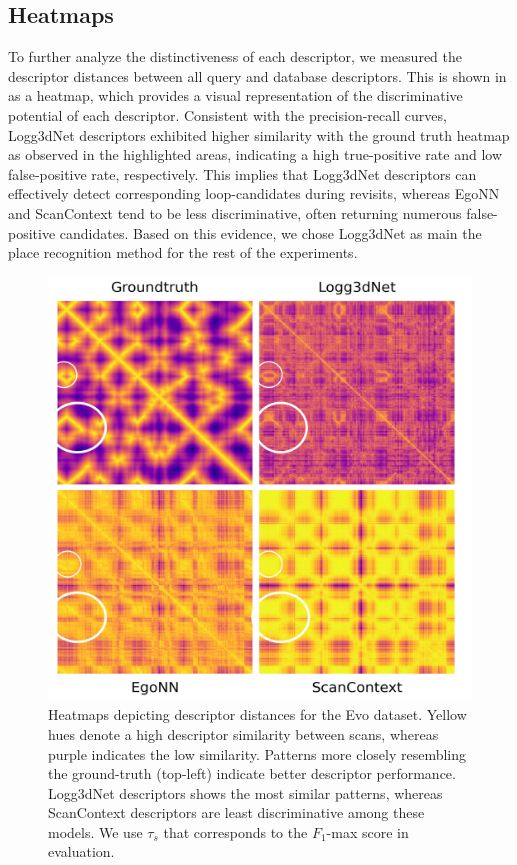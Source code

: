 \subsection*{Heatmaps}
To further analyze the distinctiveness of each descriptor, we measured the descriptor distances between all query and database descriptors. This is shown in  as a heatmap, which provides a visual representation of the discriminative potential of each descriptor. Consistent with the precision-recall curves, Logg3dNet descriptors exhibited higher similarity with the ground truth heatmap as observed in the highlighted areas, indicating a high true-positive rate and low false-positive rate, respectively. This implies that Logg3dNet descriptors can effectively detect corresponding loop-candidates during revisits, whereas EgoNN and ScanContext tend to be less discriminative, often returning numerous false-positive candidates. Based on this evidence, we chose Logg3dNet as main the place recognition method for the rest of the experiments.
\begin{figure}[htbp]
  \centering
  \includegraphics[width=0.9\linewidth]{pics/exp_1.2_heatmap_evo12_plasma_edit}
  \caption{Heatmaps depicting descriptor distances for the Evo dataset. Yellow hues denote a high descriptor similarity between scans, whereas purple indicates the low similarity. Patterns more closely resembling the ground-truth (top-left) indicate better descriptor performance. Logg3dNet descriptors shows the most similar patterns, whereas ScanContext descriptors are least discriminative among these models. We use $\tau_{s}$ that corresponds to the $F_1$-max score in evaluation.}
  \label{fig:heatmap_evo12}
\end{figure}





